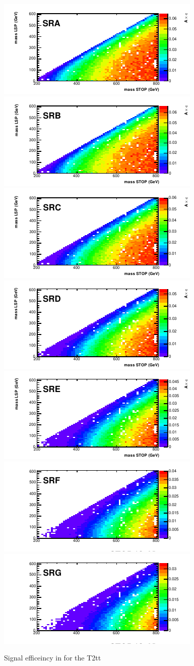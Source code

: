 \begin{figure}[hbt]
  \begin{center}
        \includegraphics[width=0.5\linewidth]{plots/stopPlot/massesA_eff.pdf}%
        \includegraphics[width=0.5\linewidth]{plots/stopPlot/massesB_eff.pdf}
        \includegraphics[width=0.5\linewidth]{plots/stopPlot/massesC_eff.pdf}%
        \includegraphics[width=0.5\linewidth]{plots/stopPlot/massesD_eff.pdf}
        \includegraphics[width=0.5\linewidth]{plots/stopPlot/massesE_eff.pdf}%
        \includegraphics[width=0.5\linewidth]{plots/stopPlot/massesF_eff.pdf}
        \includegraphics[width=0.5\linewidth]{plots/stopPlot/massesG_eff.pdf}%
    \caption{Signal efficeincy in for the T2tt }
\label{fig:SigEff}
      \end{center}
\end{figure}

